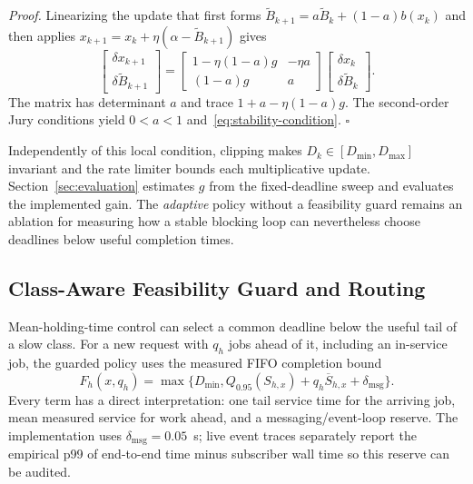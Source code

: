 \emph{Proof.} Linearizing the update that first forms $\widetilde B_{k+1}=a\widetilde B_k+(1-a)b(x_k)$ and then applies $x_{k+1}=x_k+\eta(\alpha-\widetilde B_{k+1})$ gives
\begin{equation}
 \begin{bmatrix}\delta x_{k+1}\\ \delta\widetilde B_{k+1}\end{bmatrix}
 =
 \begin{bmatrix}
 1-\eta(1-a)g & -\eta a\\
 (1-a)g & a
 \end{bmatrix}
 \begin{bmatrix}\delta x_k\\ \delta\widetilde B_k\end{bmatrix}.
\end{equation}
The matrix has determinant $a$ and trace $1+a-\eta(1-a)g$. The second-order Jury conditions yield $0<a<1$ and~\eqref{eq:stability-condition}. \hfill$\square$

Independently of this local condition, clipping makes $D_k\in[D_{\min},D_{\max}]$ invariant and the rate limiter bounds each multiplicative update. Section~\ref{sec:evaluation} estimates $g$ from the fixed-deadline sweep and evaluates the implemented gain. The \emph{adaptive} policy without a feasibility guard remains an ablation for measuring how a stable blocking loop can nevertheless choose deadlines below useful completion times.

\subsection{Class-Aware Feasibility Guard and Routing}

Mean-holding-time control can select a common deadline below the useful tail of a slow class. For a new request with $q_h$ jobs ahead of it, including an in-service job, the guarded policy uses the measured FIFO completion bound
\begin{equation}
 F_h(x,q_h)=\max\{D_{\min},Q_{0.95}(S_{h,x})+q_h\overline S_{h,x}+\delta_{\mathrm{msg}}\}.
 \label{eq:floors}
\end{equation}
Every term has a direct interpretation: one tail service time for the arriving job, mean measured service for work ahead, and a messaging/event-loop reserve. The implementation uses $\delta_{\mathrm{msg}}=0.05$~s; live event traces separately report the empirical p99 of end-to-end time minus subscriber wall time so this reserve can be audited.

